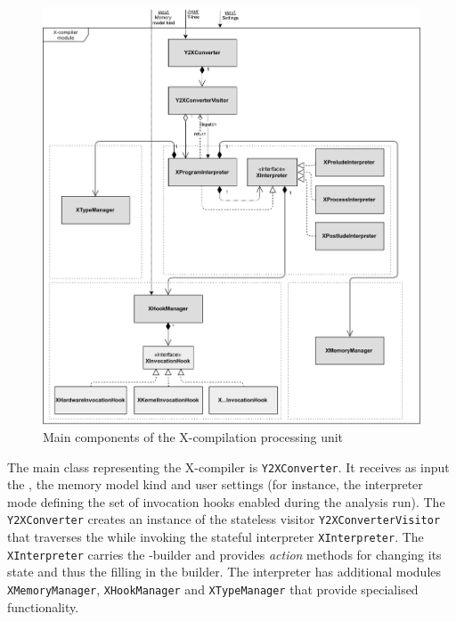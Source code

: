 \begin{figure}[!t]%
    \centering
  \includegraphics[max width=\textwidth,keepaspectratio]{img/my/draw.io/X-compiler.png}
  \caption{Main components of the X-compilation processing unit}
  \label{fig:compiler}
\end{figure}

The main class representing the X-compiler is \texttt{Y2XConverter}.
It receives as input the \ytree{}, the memory model kind and user settings (for instance, the interpreter mode defining the set of invocation hooks enabled during the analysis run).
The \texttt{Y2XConverter} creates an instance of the stateless visitor \texttt{Y2XConverterVisitor} that traverses the \ytree{} while invoking the stateful interpreter \texttt{XInterpreter}.
The \texttt{XInterpreter} carries the \xgraph{}-builder and provides \textit{action} methods for changing its state and thus the filling in the builder.
The interpreter has additional modules \texttt{XMemoryManager}, \texttt{XHookManager} and \texttt{XTypeManager} that provide specialised functionality.

